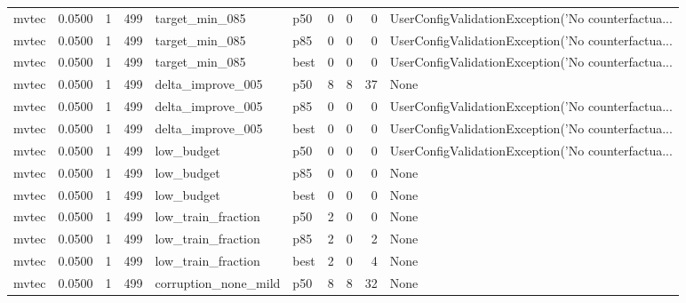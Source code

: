 \begin{tabular}{lrrrllrrrl}
   mvtec &    0.0500 &    1 &    499 &       target\_min\_085 &    p50 &               0 &          0 &       0 & UserConfigValidationException('No counterfactua... \\
   mvtec &    0.0500 &    1 &    499 &       target\_min\_085 &    p85 &               0 &          0 &       0 & UserConfigValidationException('No counterfactua... \\
   mvtec &    0.0500 &    1 &    499 &       target\_min\_085 &   best &               0 &          0 &       0 & UserConfigValidationException('No counterfactua... \\
   mvtec &    0.0500 &    1 &    499 &    delta\_improve\_005 &    p50 &               8 &          8 &      37 &                                               None \\
   mvtec &    0.0500 &    1 &    499 &    delta\_improve\_005 &    p85 &               0 &          0 &       0 & UserConfigValidationException('No counterfactua... \\
   mvtec &    0.0500 &    1 &    499 &    delta\_improve\_005 &   best &               0 &          0 &       0 & UserConfigValidationException('No counterfactua... \\
   mvtec &    0.0500 &    1 &    499 &           low\_budget &    p50 &               0 &          0 &       0 & UserConfigValidationException('No counterfactua... \\
   mvtec &    0.0500 &    1 &    499 &           low\_budget &    p85 &               0 &          0 &       0 &                                               None \\
   mvtec &    0.0500 &    1 &    499 &           low\_budget &   best &               0 &          0 &       0 &                                               None \\
   mvtec &    0.0500 &    1 &    499 &   low\_train\_fraction &    p50 &               2 &          0 &       0 &                                               None \\
   mvtec &    0.0500 &    1 &    499 &   low\_train\_fraction &    p85 &               2 &          0 &       2 &                                               None \\
   mvtec &    0.0500 &    1 &    499 &   low\_train\_fraction &   best &               2 &          0 &       4 &                                               None \\
   mvtec &    0.0500 &    1 &    499 & corruption\_none\_mild &    p50 &               8 &          8 &      32 &                                               None \\

\end{tabular}

